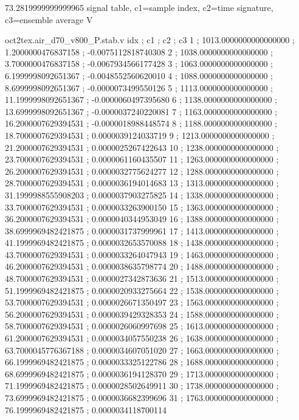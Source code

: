 \expandafter\def\csname oct2tex.air_d70_v800_P.hub.v\endcsname{73.2819999999999965}
\expandafter\def\csname oct2tex.air_d70_v800_P.stab.d\endcsname{signal table, c1=sample index, c2=time signature, c3=ensemble average}
\expandafter\def\csname oct2tex.air_d70_v800_P.stab.u\endcsname{\ensuremath{\text{V}}}
\begin{filecontents}[overwrite]{oct2tex.air_d70_v800_P.stab.v}
idx ; c1 ; c2 ; c3
1 ; 1013.0000000000000000 ; 1.2000000476837158 ; -0.0075112818740308
2 ; 1038.0000000000000000 ; 3.7000000476837158 ; -0.0067934566177428
3 ; 1063.0000000000000000 ; 6.1999998092651367 ; -0.0048552560620010
4 ; 1088.0000000000000000 ; 8.6999998092651367 ; -0.0000073499550126
5 ; 1113.0000000000000000 ; 11.1999998092651367 ; -0.0000060497395680
6 ; 1138.0000000000000000 ; 13.6999998092651367 ; -0.0000037240220081
7 ; 1163.0000000000000000 ; 16.2000007629394531 ; -0.0000018988448574
8 ; 1188.0000000000000000 ; 18.7000007629394531 ; 0.0000039124033719
9 ; 1213.0000000000000000 ; 21.2000007629394531 ; 0.0000025267422643
10 ; 1238.0000000000000000 ; 23.7000007629394531 ; 0.0000061160435507
11 ; 1263.0000000000000000 ; 26.2000007629394531 ; 0.0000032775624277
12 ; 1288.0000000000000000 ; 28.7000007629394531 ; 0.0000036194014683
13 ; 1313.0000000000000000 ; 31.1999988555908203 ; 0.0000037903275825
14 ; 1338.0000000000000000 ; 33.7000007629394531 ; 0.0000033263900150
15 ; 1363.0000000000000000 ; 36.2000007629394531 ; 0.0000040344953049
16 ; 1388.0000000000000000 ; 38.6999969482421875 ; 0.0000031737999961
17 ; 1413.0000000000000000 ; 41.1999969482421875 ; 0.0000032653570088
18 ; 1438.0000000000000000 ; 43.7000007629394531 ; 0.0000033264047943
19 ; 1463.0000000000000000 ; 46.2000007629394531 ; 0.0000038635798774
20 ; 1488.0000000000000000 ; 48.7000007629394531 ; 0.0000027342873636
21 ; 1513.0000000000000000 ; 51.1999969482421875 ; 0.0000020933275664
22 ; 1538.0000000000000000 ; 53.7000007629394531 ; 0.0000026671350497
23 ; 1563.0000000000000000 ; 56.2000007629394531 ; 0.0000039429328353
24 ; 1588.0000000000000000 ; 58.7000007629394531 ; 0.0000026060997698
25 ; 1613.0000000000000000 ; 61.2000007629394531 ; 0.0000034057550238
26 ; 1638.0000000000000000 ; 63.7000045776367188 ; 0.0000034607051020
27 ; 1663.0000000000000000 ; 66.1999969482421875 ; 0.0000033325122786
28 ; 1688.0000000000000000 ; 68.6999969482421875 ; 0.0000036194128370
29 ; 1713.0000000000000000 ; 71.1999969482421875 ; 0.0000028502649911
30 ; 1738.0000000000000000 ; 73.6999969482421875 ; 0.0000036682399696
31 ; 1763.0000000000000000 ; 76.1999969482421875 ; 0.0000034118700114

\end{filecontents}
